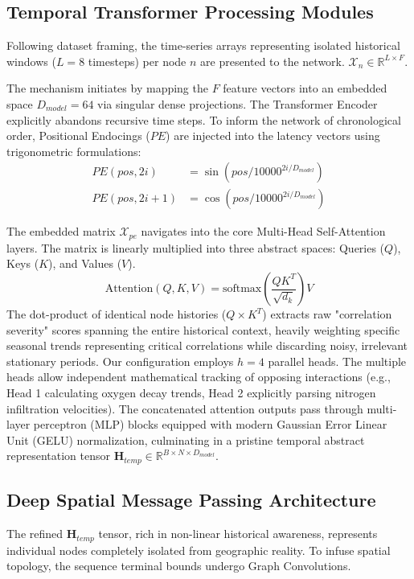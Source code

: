 \documentclass[journal,10pt,twocolumn]{IEEEtran}
\begin{document}
\subsection{Temporal Transformer Processing Modules}
Following dataset framing, the time-series arrays representing isolated historical windows ($L=8$ timesteps) per node $n$ are presented to the network. $\mathcal{X}_{n} \in \mathbb{R}^{L \times F}$.

The mechanism initiates by mapping the $F$ feature vectors into an embedded space $D_{model} = 64$ via singular dense projections. The Transformer Encoder explicitly abandons recursive time steps. To inform the network of chronological order, Positional Endocings ($PE$) are injected into the latency vectors using trigonometric formulations:
\begin{align}
    PE(pos, 2i) &= \sin(pos / 10000^{2i/D_{model}}) \\
    PE(pos, 2i+1) &= \cos(pos / 10000^{2i/D_{model}})
\end{align}

The embedded matrix $\mathcal{X}_{pe}$ navigates into the core Multi-Head Self-Attention layers. The matrix is linearly multiplied into three abstract spaces: Queries ($Q$), Keys ($K$), and Values ($V$).
\begin{equation}
    \text{Attention}(Q,K,V) = \text{softmax}\left( \frac{Q K^T}{\sqrt{d_k}} \right) V
\end{equation}
The dot-product of identical node histories ($Q \times K^T$) extracts raw "correlation severity" scores spanning the entire historical context, heavily weighting specific seasonal trends representing critical correlations while discarding noisy, irrelevant stationary periods. 
Our configuration employs $h=4$ parallel heads. The multiple heads allow independent mathematical tracking of opposing interactions (e.g., Head 1 calculating oxygen decay trends, Head 2 explicitly parsing nitrogen infiltration velocities).
The concatenated attention outputs pass through multi-layer perceptron (MLP) blocks equipped with modern Gaussian Error Linear Unit (GELU) normalization, culminating in a pristine temporal abstract representation tensor $\mathbf{H}_{temp} \in \mathbb{R}^{B \times N \times D_{model}}$.

\subsection{Deep Spatial Message Passing Architecture}
The refined $\mathbf{H}_{temp}$ tensor, rich in non-linear historical awareness, represents individual nodes completely isolated from geographic reality. To infuse spatial topology, the sequence terminal bounds undergo Graph Convolutions.
\end{document}

